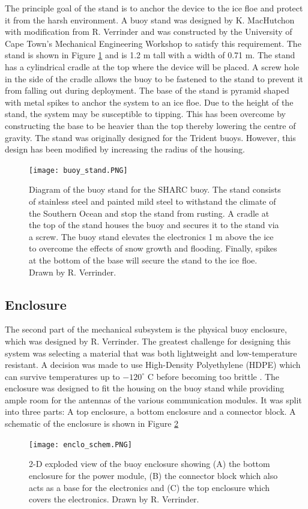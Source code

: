 The principle goal of the stand is to anchor the device to the ice floe and protect it from the harsh environment. A buoy stand was designed by K. MacHutchon with modification from R. Verrinder and was constructed by the University of Cape Town's Mechanical Engineering Workshop to satisfy this requirement. The stand is shown in Figure \ref{fig:stand} and is 1.2 m tall with a width of 0.71 m. The stand has a cylindrical cradle at the top where the device will be placed. A screw hole in the side of the cradle allows the buoy to be fastened to the stand to prevent it from falling out during deployment. The base of the stand is pyramid shaped with metal spikes to anchor the system to an ice floe. Due to the height of the stand, the system may be susceptible to tipping. This has been overcome by constructing the base to be heavier than the top thereby lowering the centre of gravity. The stand was originally designed for the Trident buoys. However, this design has been modified by increasing the radius of the housing. 

\begin{figure}[H]
	\centering
	\texttt{[image: buoy\_stand.PNG]}
	\caption{Diagram of the buoy stand for the SHARC buoy. The stand consists of stainless steel and painted mild steel to withstand the climate of the Southern Ocean and stop the stand from rusting. A cradle at the top of the stand houses the buoy and secures it to the stand via a screw. The buoy stand elevates the electronics 1 m above the ice to overcome the effects of snow growth and flooding. Finally, spikes at the bottom of the base will secure the stand to the ice floe. Drawn by R. Verrinder.}
	\label{fig:stand}
\end{figure}

\subsection{Enclosure}

The second part of the mechanical subsystem is the physical buoy enclosure, which was designed by R. Verrinder. The greatest challenge for designing this system was selecting a material that was both lightweight and low-temperature resistant. A decision was made to use High-Density Polyethylene (HDPE) which can survive temperatures up to $-120 ^\circ$ C before becoming too brittle \cite{drnovska2003surface}. The enclosure was designed to fit the housing on the buoy stand while providing ample room for the antennas of the various communication modules. It was split into three parts: A top enclosure, a bottom enclosure and a connector block. A schematic of the enclosure is shown in Figure \ref{fig:enclo_schem}
\begin{figure}[H]
	\centering
	\texttt{[image: enclo\_schem.PNG]}
	\caption{2-D exploded view of the buoy enclosure showing (A) the bottom enclosure for the power module, (B) the connector block which also acts as a base for the electronics and (C) the top enclosure which covers the electronics. Drawn by R. Verrinder.}
	\label{fig:enclo_schem}
\end{figure}

